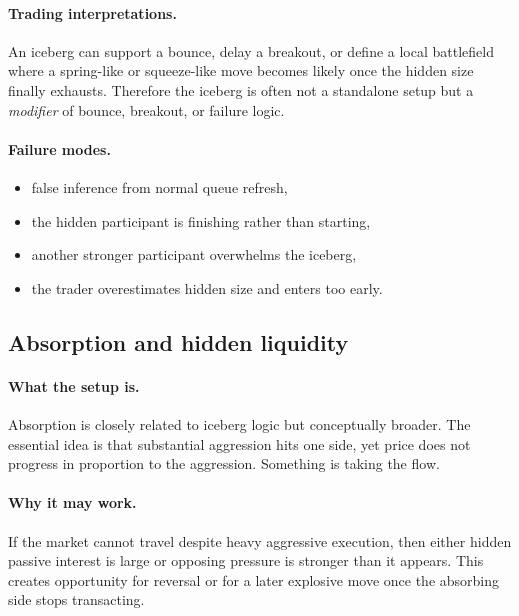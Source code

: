 \paragraph{Trading interpretations.} An iceberg can support a bounce, delay a breakout, or define a local battlefield where a spring-like or squeeze-like move becomes likely once the hidden size finally exhausts. Therefore the iceberg is often not a standalone setup but a \emph{modifier} of bounce, breakout, or failure logic.

\paragraph{Failure modes.}
\begin{itemize}
\item false inference from normal queue refresh,
\item the hidden participant is finishing rather than starting,
\item another stronger participant overwhelms the iceberg,
\item the trader overestimates hidden size and enters too early.
\end{itemize}


\subsection{Absorption and hidden liquidity}

\paragraph{What the setup is.} Absorption is closely related to iceberg logic but conceptually broader. The essential idea is that substantial aggression hits one side, yet price does not progress in proportion to the aggression. Something is taking the flow.

\paragraph{Why it may work.} If the market cannot travel despite heavy aggressive execution, then either hidden passive interest is large or opposing pressure is stronger than it appears. This creates opportunity for reversal or for a later explosive move once the absorbing side stops transacting.

